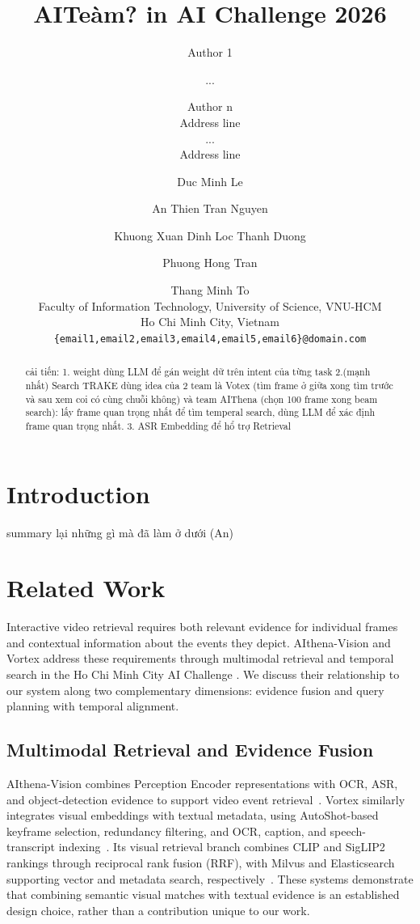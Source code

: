 \documentclass[11pt]{article}
\title{AITeàm? in AI Challenge 2026}
\author{Author 1 \and ... \and Author n \\
        Address line \\ ... \\ Address line}
\author{
  Duc Minh Le \and
  An Thien Tran Nguyen \and
  Khuong Xuan Dinh 
  \AND
  Loc Thanh Duong \and
  Phuong Hong Tran \and
  Thang Minh To
   \\
  Faculty of Information Technology, University of Science, VNU-HCM \\
  Ho Chi Minh City, Vietnam \\
  \texttt{\{email1,email2,email3,email4,email5,email6\}@domain.com}
}
\begin{document}
\maketitle
\begin{abstract}
cải tiến:
1. weight dùng LLM để gán weight dữ trên intent của từng task
2.(mạnh nhất) Search TRAKE dùng idea của 2 team là Votex (tìm frame ở giữa xong tìm trước và sau xem coi có cùng chuỗi không) và team AIThena (chọn 100 frame xong beam search): lấy frame quan trọng nhất để tìm temperal search, dùng LLM để xác định frame quan trọng nhất. 
3. ASR Embedding để hổ trợ Retrieval
\end{abstract}



\section{Introduction}
summary lại những gì mà đã làm ở dưới (An) 

\section{Related Work}

Interactive video retrieval requires both relevant evidence for individual
frames and contextual information about the events they depict.
AIthena-Vision and Vortex address these requirements through multimodal
retrieval and temporal search in the Ho Chi Minh City AI Challenge
\citep{nguyen2027aithena,nguyen2027vortex}. We discuss their relationship
to our system along two complementary dimensions: evidence fusion and
query planning with temporal alignment.

\subsection{Multimodal Retrieval and Evidence Fusion}
\label{sec:related-work-retrieval}

AIthena-Vision combines Perception Encoder representations with OCR,
ASR, and object-detection evidence to support video event
retrieval~\citep{nguyen2027aithena}. Vortex similarly integrates visual
embeddings with textual metadata, using AutoShot-based keyframe
selection, redundancy filtering, and OCR, caption, and speech-transcript
indexing~\citep{nguyen2027vortex}. Its visual retrieval branch combines
CLIP and SigLIP2 rankings through reciprocal rank fusion (RRF), with
Milvus and Elasticsearch supporting vector and metadata search,
respectively~\citep{nguyen2027vortex}. These systems demonstrate that
combining semantic visual matches with textual evidence is an
established design choice, rather than a contribution unique to our
work.
\end{document}
